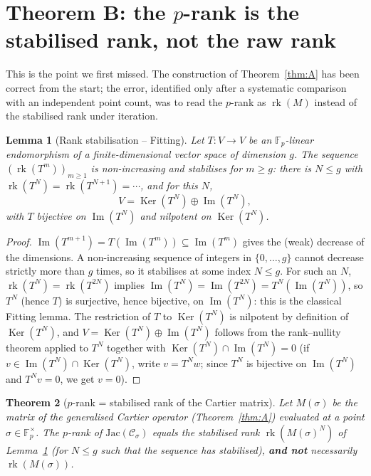 \documentclass[11pt,a4paper]{article}
\newtheorem{theorem}{Theorem}[section]
\newtheorem{lemma}[theorem]{Lemma}
\newcommand{\F}{\mathbb{F}}
\DeclareMathOperator{\rg}{rk}
\DeclareMathOperator{\Ker}{Ker}
\begin{document}
\section{Theorem B: the $p$-rank is the stabilised rank, not the raw rank}

This is the point we first missed. The construction of Theorem~\ref{thm:A} has
been correct from the start; the error, identified only after a systematic
comparison with an independent point count, was to read the $p$-rank as
$\rg(M)$ instead of the stabilised rank under iteration.

\begin{lemma}[Rank stabilisation -- Fitting]
\label{lemma:fitting}
Let $T:V\to V$ be an $\F_p$-linear endomorphism of a finite-dimensional vector
space of dimension $g$. The sequence $(\rg(T^m))_{m\ge1}$ is non-increasing and
stabilises for $m\ge g$: there is $N\le g$ with
$\rg(T^N)=\rg(T^{N+1})=\cdots$, and for this $N$,
$$V=\Ker(T^N)\oplus\operatorname{Im}(T^N),$$
with $T$ bijective on $\operatorname{Im}(T^N)$ and nilpotent on $\Ker(T^N)$.
\end{lemma}

\begin{proof}
$\operatorname{Im}(T^{m+1})=T(\operatorname{Im}(T^m))\subseteq\operatorname{Im}(T^m)$
gives the (weak) decrease of the dimensions. A non-increasing sequence of
integers in $\{0,\dots,g\}$ cannot decrease strictly more than $g$ times, so it
stabilises at some index $N\le g$. For such an $N$, $\rg(T^N)=\rg(T^{2N})$ implies
$\operatorname{Im}(T^N)=\operatorname{Im}(T^{2N})=T^N(\operatorname{Im}(T^N))$, so
$T^N$ (hence $T$) is surjective, hence bijective, on $\operatorname{Im}(T^N)$:
this is the classical Fitting lemma. The restriction of $T$ to $\Ker(T^N)$ is
nilpotent by definition of $\Ker(T^N)$, and $V=\Ker(T^N)\oplus\operatorname{Im}(T^N)$
follows from the rank--nullity theorem applied to $T^N$ together with
$\Ker(T^N)\cap\operatorname{Im}(T^N)=0$ (if $v\in\operatorname{Im}(T^N)\cap\Ker(T^N)$,
write $v=T^Nw$; since $T^N$ is bijective on $\operatorname{Im}(T^N)$ and
$T^N v=0$, we get $v=0$).
\end{proof}

\begin{theorem}[$p$-rank = stabilised rank of the Cartier matrix]
\label{thm:B}
Let $M(\sigma)$ be the matrix of the generalised Cartier operator
(Theorem~\ref{thm:A}) evaluated at a point $\sigma\in\F_p^\times$. The $p$-rank
of $\mathrm{Jac}(\mathcal{C}_\sigma)$ equals the stabilised rank $\rg(M(\sigma)^N)$
of Lemma~\ref{lemma:fitting} (for $N\le g$ such that the sequence has
stabilised), \textbf{and not} necessarily $\rg(M(\sigma))$.
\end{theorem}
\end{document}
